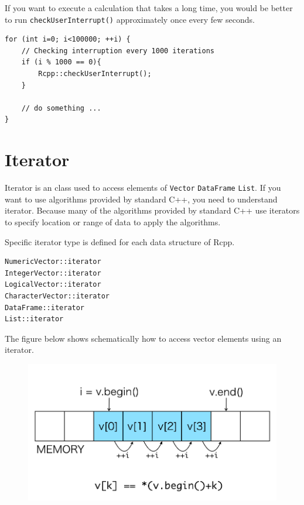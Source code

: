 \documentclass[]{book}
\theoremstyle{definition}
\theoremstyle{definition}
\theoremstyle{remark}
\begin{document}
If you want to execute a calculation that takes a long time, you would
be better to run \texttt{checkUserInterrupt()} approximately once every
few seconds.

\begin{verbatim}
for (int i=0; i<100000; ++i) {
    // Checking interruption every 1000 iterations
    if (i % 1000 == 0){
        Rcpp::checkUserInterrupt();
    }

    // do something ...
}
\end{verbatim}

\chapter{Iterator}\label{iterator}

Iterator is an class used to access elements of \texttt{Vector}
\texttt{DataFrame} \texttt{List}. If you want to use algorithms provided
by standard C++, you need to understand iterator. Because many of the
algorithms provided by standard C++ use iterators to specify location or
range of data to apply the algorithms.

Specific iterator type is defined for each data structure of Rcpp.

\begin{verbatim}
NumericVector::iterator
IntegerVector::iterator
LogicalVector::iterator
CharacterVector::iterator
DataFrame::iterator
List::iterator
\end{verbatim}

The figure below shows schematically how to access vector elements using
an iterator.

\begin{figure}
\centering
\includegraphics{iterator.png}
\caption{}
\end{figure}
\end{document}

